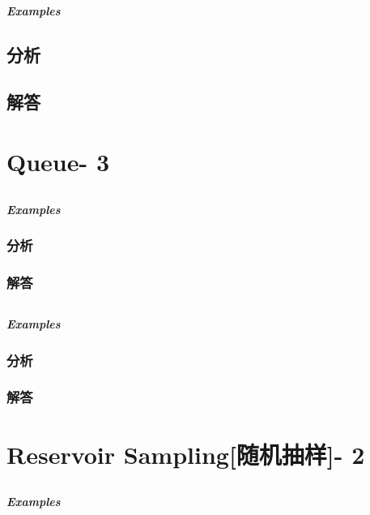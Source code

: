 \documentclass[UTF8,a4paper,12pt]{ctexbook}
\begin{document}
	\subparagraph{Examples}
	
	\subsection{分析}
	
	\subsection{解答}

\section{Queue- 3}
	\subsection{}
	
		\subparagraph{Examples}
		
		\subsubsection{分析}
	
		\subsubsection{解答}
	
	\subsection{}
	
		\subparagraph{Examples}
	
		\subsubsection{分析}
	
		\subsubsection{解答}

\section{Reservoir Sampling[随机抽样]- 2}
	\subsection{}
	
		\subparagraph{Examples}
	
\end{document}
